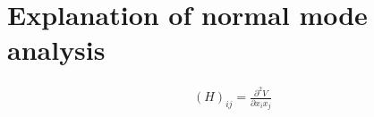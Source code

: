 \usepackage{amsmath}
\usepackage{siunitx}

    


\section{Explanation of normal mode analysis}
\begin{align}
    (H)_{ij} = \frac{\partial^2 V}{\partial x_i x_j} \\
\end{align}


